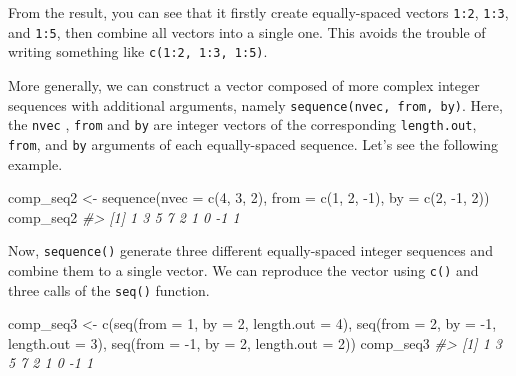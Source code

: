 \documentclass[
]{book}
\newenvironment{Shaded}{\begin{snugshade}}{\end{snugshade}}
\newcommand{\AttributeTok}[1]{\textcolor[rgb]{0.77,0.63,0.00}{#1}}
\newcommand{\CommentTok}[1]{\textcolor[rgb]{0.56,0.35,0.01}{\textit{#1}}}
\newcommand{\DecValTok}[1]{\textcolor[rgb]{0.00,0.00,0.81}{#1}}
\newcommand{\FunctionTok}[1]{\textcolor[rgb]{0.00,0.00,0.00}{#1}}
\newcommand{\NormalTok}[1]{#1}
\newcommand{\OtherTok}[1]{\textcolor[rgb]{0.56,0.35,0.01}{#1}}
\newcommand{\SpecialCharTok}[1]{\textcolor[rgb]{0.00,0.00,0.00}{#1}}
\begin{document}
From the result, you can see that it firstly create equally-spaced vectors \texttt{1:2}, \texttt{1:3}, and \texttt{1:5}, then combine all vectors into a single one. This avoids the trouble of writing something like \texttt{c(1:2,\ 1:3,\ 1:5)}.

More generally, we can construct a vector composed of more complex integer sequences with additional arguments, namely \texttt{sequence(nvec,\ from,\ by)}. Here, the \texttt{nvec} , \texttt{from} and \texttt{by} are integer vectors of the corresponding \texttt{length.out}, \texttt{from}, and \texttt{by} arguments of each equally-spaced sequence. Let's see the following example.

\begin{Shaded}
\begin{Highlighting}[]
\NormalTok{comp\_seq2 }\OtherTok{\textless{}{-}} \FunctionTok{sequence}\NormalTok{(}\AttributeTok{nvec =} \FunctionTok{c}\NormalTok{(}\DecValTok{4}\NormalTok{, }\DecValTok{3}\NormalTok{, }\DecValTok{2}\NormalTok{), }\AttributeTok{from =} \FunctionTok{c}\NormalTok{(}\DecValTok{1}\NormalTok{, }\DecValTok{2}\NormalTok{, }\SpecialCharTok{{-}}\DecValTok{1}\NormalTok{), }\AttributeTok{by =} \FunctionTok{c}\NormalTok{(}\DecValTok{2}\NormalTok{, }\SpecialCharTok{{-}}\DecValTok{1}\NormalTok{, }\DecValTok{2}\NormalTok{))}
\NormalTok{comp\_seq2}
\CommentTok{\#\textgreater{} [1]  1  3  5  7  2  1  0 {-}1  1}
\end{Highlighting}
\end{Shaded}

Now, \texttt{sequence()} generate three different equally-spaced integer sequences and combine them to a single vector. We can reproduce the vector using \texttt{c()} and three calls of the \texttt{seq()} function.

\begin{Shaded}
\begin{Highlighting}[]
\NormalTok{comp\_seq3 }\OtherTok{\textless{}{-}} \FunctionTok{c}\NormalTok{(}\FunctionTok{seq}\NormalTok{(}\AttributeTok{from =} \DecValTok{1}\NormalTok{,  }\AttributeTok{by =}  \DecValTok{2}\NormalTok{, }\AttributeTok{length.out =} \DecValTok{4}\NormalTok{),}
               \FunctionTok{seq}\NormalTok{(}\AttributeTok{from =} \DecValTok{2}\NormalTok{,  }\AttributeTok{by =} \SpecialCharTok{{-}}\DecValTok{1}\NormalTok{, }\AttributeTok{length.out =} \DecValTok{3}\NormalTok{),}
               \FunctionTok{seq}\NormalTok{(}\AttributeTok{from =} \SpecialCharTok{{-}}\DecValTok{1}\NormalTok{, }\AttributeTok{by =}  \DecValTok{2}\NormalTok{, }\AttributeTok{length.out =} \DecValTok{2}\NormalTok{))}
\NormalTok{comp\_seq3}
\CommentTok{\#\textgreater{} [1]  1  3  5  7  2  1  0 {-}1  1}
\end{Highlighting}
\end{Shaded}
\end{document}
